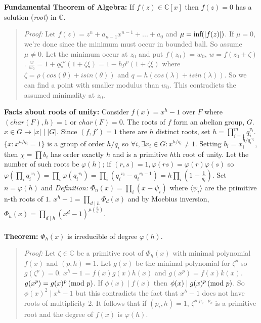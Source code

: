 \\
\\
{\bf Fundamental Theorem of Algebra:}  If $f(z) \in {\mathbb C}[x]$ then $f(z)=0$
has a solution (\emph{root}) in ${\mathbb C}$.
\begin{quote}
\emph{Proof:}
Let $f(z)= z^n+ a_{n-1} x^{n-1} + ... + a_0$ and 
$\mu= \textnormal{inf}(|f(z)|)$.   If 
$\mu = 0$, we're done since the minimum must occur in bounded ball.  So assume
$\mu \ne 0$.  Let the minimum occur at $z_{0}$ and put
$f(z_{0})= w_{0}$,
$w=f(z_{0}+ \zeta)$.  ${\frac {w} {w_{0}}}= 1+q \zeta^{\nu}(1+\zeta \xi)=
1-h \rho^{\nu}(1+ \zeta \xi)$ where $\zeta= \rho (cos(\theta) + i sin(\theta))$ and
$q= h(cos(\lambda) + i sin(\lambda))$.  So we can find a point with smaller modulus than
$w_0$.  This contradicts the assumed minimality at $z_0$.
\end{quote}
{\bf Facts about roots of unity:}  
Consider $f(x)= x^h -1$ over $F$ where 
$(char(F),h)=1$ or $char(F)=0$.
The roots of $f$ form an abelian group, $G$.  $x \in G \rightarrow |x| \mid |G|$.  Since
$(f, f')=1$ there are $h$ distinct roots, set $h= \prod_{i=1}^m q_i^{v_i}$.  
$\{ x: x^{h/q_i} = 1 \}$ is a group of order
$h/q_i$ so $\forall i, \exists x_i \in G: 
x^{h/q_i} \ne 1$.  Setting $b_i= x_i^{h/{q_i}^{v_i}}$, then $\chi = \prod b_i$ has order
exactly $h$ and is a primitive $h$th root of unity.  
Let the number of such roots be $\varphi(h)$; if $(r,s)=1, \varphi(rs)= \varphi(r) \varphi(s)$
so $\varphi(\prod_i {q_i}^{v_i})= 
\prod_i \varphi({q_i}^{v_i})= 
\prod_i ({q_i}^{v_i}- {q_i}^{v_i-1})= h \prod_i (1- {\frac 1 {q_i}})$.  Set $n=\varphi(h)$ and
\emph{Definition:} $\Phi_n(x) = \prod_i (x- \psi_i)$ where $\langle \psi_i \rangle$ are the primitive n-th roots of $1$.
$x^h-1 = \prod_{d \mid h} \Phi_d(x)$ and by Moebius inversion,
$\Phi_h(x)= \prod_{d \mid h} (x^d -1)^{\mu({\frac h d})}$.
\\
\\
{\bf Theorem:} $\Phi_h(x)$ is irreducible of
degree $\varphi(h)$.
\begin{quote}
\emph{Proof:} Let $\zeta \in {\mathbb C}$ be a primitive root of
$\Phi_h(x)$ with minimal polynomial $f(x)$ and $(p,h)=1$.  Let $g(x)$ be the minimal
polynomial for $\zeta^p$ so $g(\zeta^p)=0$.  $x^h -1 = f(x) g(x) h(x)$ and
$g(x^p)=f(x)k(x)$.  $g(x^p)=g(x)^p \thinspace \textnormal{(mod } p \textnormal{)}$.  If $\phi(x) \mid f(x)$ then
$\phi(x) \mid g(x)^p \thinspace \textnormal{(mod } p \textnormal{)}$.  So $\phi(x)^2 \mid x^h-1$ but this contradicts the
fact that $x^h -1$ does not have roots of multiplicity 2.  It follows that if $(p_i , h)=1$,
$\zeta^{p_1 p_2 \ldots p_k}$ is a primitive root and the degree of $f(x)$ is $\varphi(h)$.
\end{quote}
